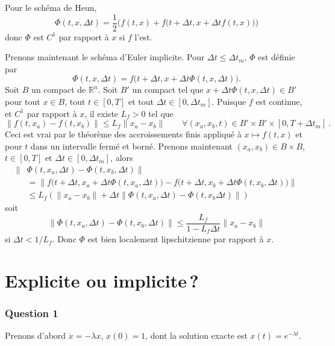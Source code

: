 Pour le schéma de Heun, \[
\Phi(t,x,{\Delta t}) = \frac{1}{2}\Big(f(t,x) + f\big(t+{\Delta t},x+{\Delta t}f(t,x)\big)\Big)
\] donc \(\Phi\) est \(C^1\) par rapport à \(x\) si \(f\) l'est.

Prenons maintenant le schéma d'Euler implicite. Pour
\({\Delta t}\leq {\Delta t}_m\), \(\Phi\) est définie par \[
\Phi(t,x,{\Delta t}) = f\Big(t+ {\Delta t}, x + {\Delta t}\Phi(t,x,{\Delta t}) \Big).
\] Soit \(B\) un compact de \(\mathbb{R}^n\). Soit \(B'\) un compact tel
que \(x + {\Delta t}\Phi(t,x,{\Delta t}) \in B'\) pour tout \(x\in B\),
tout \(t\in [ 0,T ]\) et tout \({\Delta t}\in [ 0,{\Delta t}_m ]\).
Puisque \(f\) est continue, et \(C^1\) par rapport à \(x\), il existe
\(L_f>0\) tel que \[
\|f(t,x_a) - f(t,x_b) \| \leq L_f \|x_a-x_b\| \qquad \forall (x_a,x_b,t)\in B'\times B' \times [ 0,T+{\Delta t}_m ] \ . 
\] Ceci est vrai par le théorème des accroissements finis appliqué à
\(x\mapsto f(t,x)\) et pour \(t\) dans un intervalle fermé et borné.
Prenons maintenant \((x_a,x_b)\in B\times B\), \(t\in [ 0,T ]\) et
\({\Delta t}\in [ 0,{\Delta t}_m ]\), alors \begin{align*}
\|&\Phi(t,x_a,{\Delta t})-\Phi(t,x_b,{\Delta t}) \|\\ &= \| f\Big(t+ {\Delta t}, x_a + {\Delta t}\Phi(t,x_a,{\Delta t}) \Big)-f\Big(t+ {\Delta t}, x_b + {\Delta t}\Phi(t,x_b,{\Delta t}) \Big) \|\\
&\leq L_f \left( \|x_a-x_b \| + {\Delta t}\|\Phi(t,x_a,{\Delta t})-\Phi(t,x_b{\Delta t}) \| \right)
\end{align*} soit \[
\|\Phi(t,x_a,{\Delta t})-\Phi(t,x_b,{\Delta t}) \| \leq \frac{L_f}{1-L_f {\Delta t}} \|x_a-x_b \|
\] si \({\Delta t}< 1/L_f\). Donc \(\Phi\) est bien localement
lipschitzienne par rapport à \(x\).

\hypertarget{ed2-explicite-ou-implicite}{%
\section{Explicite ou implicite\,?}\label{ed2-explicite-ou-implicite}}

\hypertarget{ed2-answer-impl-1}{%
\subsubsection*{Question 1}\label{ed2-answer-impl-1}}


Prenons d'abord \(\dot{x}= -\lambda x\), \(x(0)=1\), dont la solution
exacte est \(x(t)=e^{-\lambda t}\).

